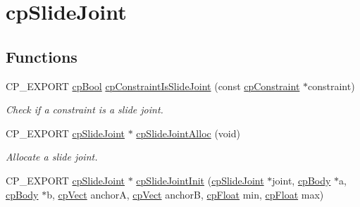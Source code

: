 \hypertarget{group__cp_slide_joint}{}\section{cp\+Slide\+Joint}
\label{group__cp_slide_joint}
\subsection*{Functions}
\begin{DoxyCompactItemize}
\item 
\mbox{\label{group__cp_slide_joint_ga8892a1e3507104813a7179002fba2779}} 
C\+P\+\_\+\+E\+X\+P\+O\+RT \mbox{\hyperlink{group__basic_types_gabc5e752c48f3449ca26ef413ecbd647e}{cp\+Bool}} \mbox{\hyperlink{group__cp_slide_joint_ga8892a1e3507104813a7179002fba2779}{cp\+Constraint\+Is\+Slide\+Joint}} (const \mbox{\hyperlink{structcp_constraint}{cp\+Constraint}} $\ast$constraint)
\begin{DoxyCompactList}\small\item\em Check if a constraint is a slide joint. \end{DoxyCompactList}\item 
\mbox{\label{group__cp_slide_joint_ga60e89e3173935480c73274241fcdcd65}} 
C\+P\+\_\+\+E\+X\+P\+O\+RT \mbox{\hyperlink{structcp_slide_joint}{cp\+Slide\+Joint}} $\ast$ \mbox{\hyperlink{group__cp_slide_joint_ga60e89e3173935480c73274241fcdcd65}{cp\+Slide\+Joint\+Alloc}} (void)
\begin{DoxyCompactList}\small\item\em Allocate a slide joint. \end{DoxyCompactList}\item 
\mbox{\label{group__cp_slide_joint_ga11ce9f9c93956a945990ebc4d3f09342}} 
C\+P\+\_\+\+E\+X\+P\+O\+RT \mbox{\hyperlink{structcp_slide_joint}{cp\+Slide\+Joint}} $\ast$ \mbox{\hyperlink{group__cp_slide_joint_ga11ce9f9c93956a945990ebc4d3f09342}{cp\+Slide\+Joint\+Init}} (\mbox{\hyperlink{structcp_slide_joint}{cp\+Slide\+Joint}} $\ast$joint, \mbox{\hyperlink{structcp_body}{cp\+Body}} $\ast$a, \mbox{\hyperlink{structcp_body}{cp\+Body}} $\ast$b, \mbox{\hyperlink{structcp_vect}{cp\+Vect}} anchorA, \mbox{\hyperlink{structcp_vect}{cp\+Vect}} anchorB, \mbox{\hyperlink{group__basic_types_gac1ed65573e035bf892505768c852d8d3}{cp\+Float}} min, \mbox{\hyperlink{group__basic_types_gac1ed65573e035bf892505768c852d8d3}{cp\+Float}} max)

\end{DoxyCompactItemize}

